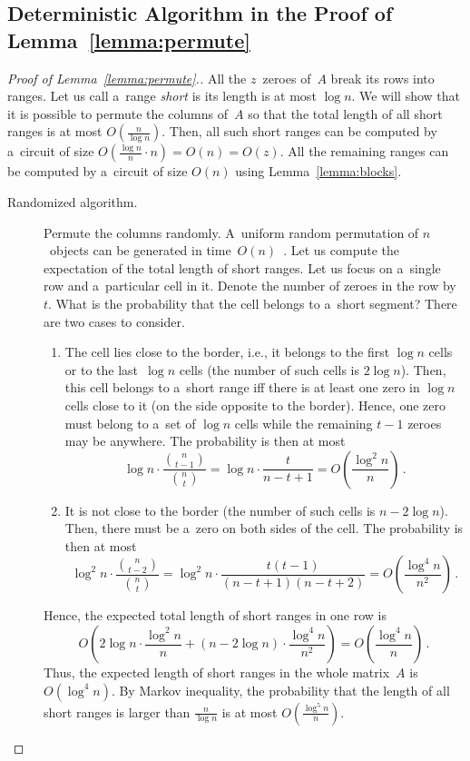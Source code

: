 \subsection{Deterministic Algorithm in the Proof of Lemma~\ref{lemma:permute}} \label{sec:deterministic}

\begin{proof}[Proof of Lemma~\ref{lemma:permute}.]
All the $z$~zeroes of~$A$ break its rows into ranges.
Let us call a~range {\em short} is its length is at most $\log n$.
We will show that it is possible to permute the columns of~$A$
so that the total length of all short ranges is at most $O(\frac{n}{\log n})$. Then, all such short ranges can be computed by a~circuit of size $O(\frac{\log n}{n} \cdot n)=O(n)=O(z)$.
All the remaining ranges can be computed by a~circuit of size $O(n)$ using Lemma~\ref{lemma:blocks}.

\begin{description}
\item[Randomized algorithm.]

Permute the columns randomly. A~uniform random permutation
of $n$~objects can be generated in time~$O(n)$~\cite[Algorithm~P (Shuffling)]{DBLP:books/lib/Knuth98}.
Let us compute the expectation of
the total length of short ranges.
Let us focus on a~single row and a~particular cell in it. Denote the number of zeroes in the row by~$t$. What is the probability that the cell belongs to a~short segment? There are two cases to consider.
\begin{enumerate}
\item The cell lies close to the border, i.e., it belongs to
the first $\log n$ cells or to the last~$\log n$ cells
(the number of such cells is $2\log n$). Then,
this cell belongs to a~short range iff there is at least one zero
in $\log n$ cells close to it (on the side opposite to the border).
Hence, one zero must belong to a~set of $\log n$ cells while the remaining $t-1$ zeroes may be anywhere.
The probability is then at most
\[\log n \cdot \frac{\binom{n}{t-1}}{\binom{n}{t}}=\log n \cdot \frac{t}{n-t+1}=O\left(\frac{\log^2n}{n}\right) \, .\]
\item It is not close to the border (the number of such cells is $n-2\log n$). Then, there must be a~zero on both sides of the
cell. The probability is then at most
\[\log^2 n \cdot \frac{\binom{n}{t-2}}{\binom{n}{t}}=\log^2n \cdot \frac{t(t-1)}{(n-t+1)(n-t+2)}=O\left(\frac{\log^4 n}{n^2}\right) \, .\]
\end{enumerate}
Hence, the expected total length of short ranges in one row is
\[O\left( 2\log n \cdot \frac{\log^2 n}{n} + (n-2\log n) \cdot \frac{\log^4 n}{n^2}\right)=O\left(\frac{\log^4 n}{n}\right) \, .\]
Thus, the expected length of short ranges in the whole
matrix~$A$ is $O(\log^4n)$. By Markov inequality, the probability that
the length of all short ranges is larger than $\frac{n}{\log n}$ is
at most $O(\frac{\log^5 n}{n})$.


\end{description}
\end{proof}
